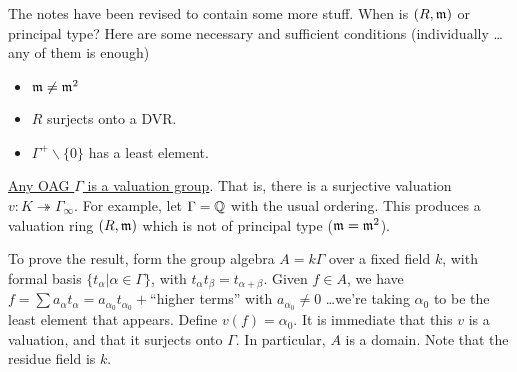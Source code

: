  \setcounter{lecture}{35}

 The notes have been revised to contain some more stuff. When is $(R,\mathfrak{m})$ or principal
 type? Here are some necessary and sufficient conditions (individually \dots any of them
 is enough)
 \begin{itemize}
   \item $\mathfrak{m}\neq\mathfrak{m}^2$
   \item $R$ surjects onto a DVR.
   \item $\Gamma^+\smallsetminus \{0\}$ has a least element.
 \end{itemize}

 \underline{Any OAG $\Gamma$ is a valuation group}. That is, there is a surjective
 valuation $v:K\twoheadrightarrow \Gamma_\infty$. For example, let $\Gamma=\mathbb{Q}$ with the
 usual ordering. This produces a valuation ring $(R,\mathfrak{m})$ which is not of principal type
 ($\mathfrak{m}=\mathfrak{m}^2$).

 To prove the result, form the group algebra $A=k\Gamma$ over a fixed field $k$, with
 formal basis $\{t_\alpha|\alpha\in \Gamma\}$, with $t_\alpha t_\beta=t_{\alpha+\beta}$.
 Given $f\in A$, we have $f=\sum a_\alpha t_\alpha = a_{\alpha_0}t_{\alpha_0} + $``higher
 terms'' with $a_{\alpha_0}\neq0$ \dots we're taking $\alpha_0$ to be the least element
 that appears. Define $v(f)=\alpha_0$. It is immediate that this $v$ is a valuation, and
 that it surjects onto $\Gamma$. In particular, $A$ is a domain. Note that the residue
 field is $k$.

